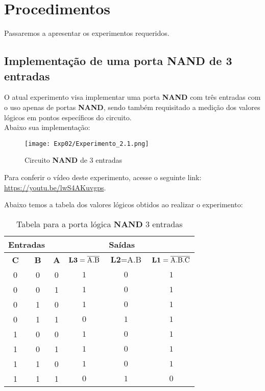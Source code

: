 \documentclass[12pt]{article}
\begin{document}
\section{Procedimentos}
\label{sec:Procedimentos}

Passaremos a apresentar os experimentos requeridos.

\subsection{Implementação de uma porta \textbf{NAND} de 3 entradas}
\label{sec:led_chave}

O atual experimento visa implementar uma porta \textbf{NAND} com três entradas com o uso apenas de portas \textbf{NAND}, sendo também requisitado a medição dos valores lógicos em pontos específicos do circuito.\\
Abaixo sua implementação:
\begin{figure}[H]
    \centering
    \texttt{[image: Exp02/Experimento\_2.1.png]}
    \caption{Circuito \textbf{NAND} de 3 entradas}
    \label{fig:Esquema_Experimento2_2.3}
\end{figure}

Para conferir o vídeo deste experimento, acesse o seguinte link:
\href{https://youtu.be/lwS4AKuvgps}{https://youtu.be/lwS4AKuvgps}.

Abaixo temos a tabela dos valores lógicos obtidos ao realizar o experimento:

\begin{table}[H]
    \centering
    \caption{Tabela para a porta lógica \textbf{NAND} 3 entradas}
    \begin{tabular}{|c|c|c|c|c|c|}
     \hline
    \multicolumn{2}{|c|}{Entradas} & \multicolumn{4}{|c|}{Saídas} \\
    \hline
    \textbf{C} & \textbf{B} & \textbf{A} & $\textbf{L3}=\overline{\rm A.B}$ & $\textbf{L2}=\text{A.B}$ & $\textbf{L1}=\overline{\rm A.B.C}$ \\
    \hline
    0 & 0  & 0 & \(1\) & \(0\) & \(1\) \\
    \hline
    0 & 0  & 1 & \(1\) & \(0\) & \(1\) \\
    \hline
    0 & 1  & 0 & \(1\) & \(0\) & \(1\) \\
    \hline
    0 & 1  & 1 & \(0\) & \(1\) & \(1\) \\
    \hline
    1 & 0  & 0 & \(1\) & \(0\) & \(1\) \\
    \hline
    1 & 0  & 1 & \(1\) & \(0\) & \(1\) \\
    \hline
    1 & 1  & 0 & \(1\) & \(0\) & \(1\) \\
    \hline
    1 & 1  & 1 & \(0\) & \(1\) & \(0\) \\
    \hline
    \end{tabular}\label{tab:tabela_and}
\end{table}
\end{document}
